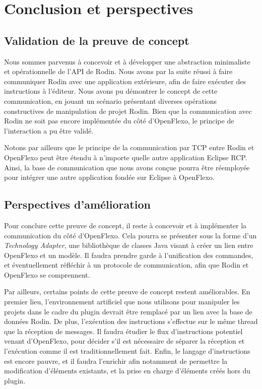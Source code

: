 \chapter*{Conclusion et perspectives}
\label{sec:conclusion}


\section*{Validation de la preuve de concept}
\label{sec:validation}

Nous sommes parvenus à concevoir et à développer une abstraction minimaliste et opérationnelle de l'API de Rodin.
Nous avons par la suite réussi à faire communiquer Rodin avec une application extérieure, afin de faire exécuter des instructions à l'éditeur.
Nous avons pu démontrer le concept de cette communication, en jouant un scénario présentant diverses opérations constructives de manipulation de projet Rodin.
Bien que la communication avec Rodin ne soit pas encore implémentée du côté d'OpenFlexo, le principe de l'interaction a pu être validé.

Notons par ailleurs que le principe de la communication par TCP entre Rodin et OpenFlexo peut être étendu à n'importe quelle autre application Eclipse RCP.
Ainsi, la base de communication que nous avons conçue pourra être réemployée pour intégrer une autre application fondée sur Eclipse à OpenFlexo.


\section*{Perspectives d'amélioration}
\label{sec:perspectives}

Pour conclure cette preuve de concept, il reste à concevoir et à implémenter la communication du côté d'OpenFlexo.
Cela pourra se présenter sous la forme d'un \textit{Technology Adapter}, une bibliothèque de classes Java visant à créer un lien entre OpenFlexo et un modèle.
Il faudra prendre garde à l'unification des commandes, et éventuellement réfléchir à un protocole de communication, afin que Rodin et OpenFlexo se comprennent.

Par ailleurs, certains points de cette preuve de concept restent améliorables.
En premier lieu, l'environnement artificiel que nous utilisons pour manipuler les projets dans le cadre du plugin devrait être remplacé par un lien avec la base de données Rodin.
De plus, l'exécution des instructions s'effectue sur le même thread que la réception de messages.
Il faudra étudier le flux d'instructions potentiel venant d'OpenFlexo, pour décider s'il est nécessaire de séparer la réception et l'exécution comme il est traditionnellement fait.
Enfin, le langage d'instructions est encore pauvre, et il faudra l'enrichir afin notamment de permettre la modification d'éléments existants, et la prise en charge d'éléments créés hors %
du plugin.
